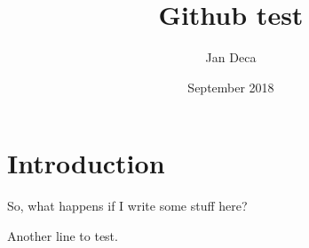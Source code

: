 \documentclass{article}
\title{Github test}
\author{Jan Deca}
\date{September 2018}
\begin{document}
\maketitle

\section{Introduction}

So, what happens if I write some stuff here?

Another line to test.
\end{document}
